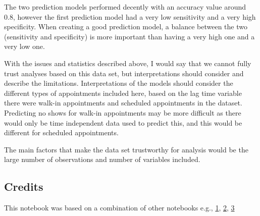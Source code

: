 \documentclass[
]{article}
\begin{document}
The two prediction models performed decently with an accuracy value
around 0.8, however the first prediction model had a very low
sensitivity and a very high specificity. When creating a good prediction
model, a balance between the two (sensitivity and specificity) is more
important than having a very high one and a very low one.

With the issues and statistics described above, I would say that we
cannot fully trust analyses based on this data set, but interpretations
should consider and describe the limitations. Interpretations of the
models should consider the different types of appointments included
here, based on the lag time variable there were walk-in appointments and
scheduled appointments in the dataset. Predicting no shows for walk-in
appointments may be more difficult as there would only be time
independent data used to predict this, and this would be different for
scheduled appointments.

The main factors that make the data set trustworthy for analysis would
be the large number of observations and number of variables included.

\hypertarget{credits}{%
\subsection{Credits}\label{credits}}

This notebook was based on a combination of other notebooks e.g.,
\href{https://www.kaggle.com/code/tsilveira/applying-heatmaps-for-categorical-data-analysis}{1},
\href{https://www.kaggle.com/code/samratp/predict-show-noshow-eda-visualization-model}{2},
\href{https://www.kaggle.com/code/andrewmvd/exploring-and-predicting-no-shows-with-xgboost/report}{3}
\end{document}
